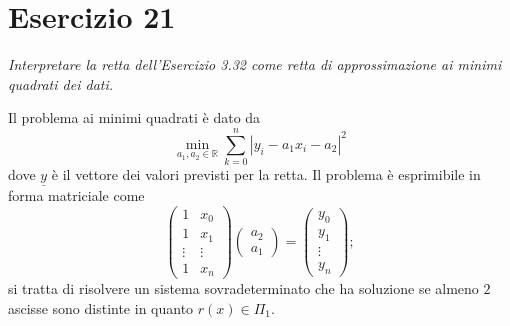 \section{Esercizio 21}
\label{sub:Esercizio 21}
\emph{Interpretare la retta dell'Esercizio 3.32 come retta di approssimazione ai minimi quadrati dei dati.}
\begin{sol}
	\normalfont Il problema ai minimi quadrati è dato da
	$$\min_{a_1,a_2\in\mathbb{R}}{\sum_{k=0}^n{|y_i-a_1x_i-a_2|^2}}$$
	dove $\underline{y}$ è il vettore dei valori previsti per la retta.
	Il problema è esprimibile in forma matriciale come
	$$\begin{pmatrix}1&x_0\\1&x_1\\\vdots&\vdots\\1&x_n\end{pmatrix}\begin{pmatrix}a_2\\a_1\end{pmatrix}=\begin{pmatrix}y_0\\y_1\\\vdots\\y_n\end{pmatrix} ;$$
	si tratta di risolvere un sistema sovradeterminato che ha soluzione se almeno $2$ ascisse sono distinte in quanto $r(x)\in\Pi_1$.
\end{sol}

